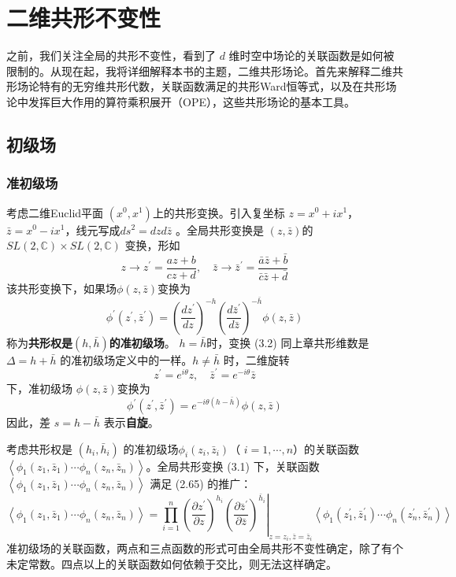 \chapter{二维共形不变性}

之前，我们关注全局的共形不变性，看到了 $d$ 维时空中场论的关联函数是如何被限制的。从现在起，我将详细解释本书的主题，二维共形场论。首先来解释二维共形场论特有的无穷维共形代数，关联函数满足的共形Ward恒等式，以及在共形场论中发挥巨大作用的算符乘积展开（OPE），这些共形场论的基本工具。

\section{初级场}
\subsection{准初级场}
考虑二维Euclid平面 $(x^0,x^1) $上的共形变换。引入复坐标 $z=x^0+ix^1 $，$ \bar{z}=x^0-ix^1 $，线元写成$ ds^2=dzd\bar{z}$ 。全局共形变换是 $(z,\bar{z}) $的$ S L(2, \mathbb{C}) \times S L(2, \mathbb{C})$ 变换，形如
\begin{equation}
z \rightarrow z^{\prime}=\frac{a z+b}{c z+d}, \quad \bar{z} \rightarrow \bar{z}^{\prime}=\frac{\bar{a} \bar{z}+\bar{b}}{\bar{c} \bar{z}+\bar{d}}
\end{equation}
该共形变换下，如果场$ \phi(z,\bar{z}) $变换为
\begin{equation}
		\phi^{\prime}\left(z^{\prime}, \bar{z}^{\prime}\right)=\left(\frac{d z^{\prime}}{d z}\right)^{-h}\left(\frac{d \bar{z}^{\prime}}{d \bar{z}}\right)^{-\bar{h}} \phi(z, \bar{z})
\end{equation}
称为\textbf{共形权是$ (h,\bar{h}) $的准初级场}。 $h=\bar{h} $时，变换 (3.2) 同上章共形维数是$ \Delta=h+\bar{h}$ 的准初级场定义中的一样。$ h\neq \bar{h}$ 时，二维旋转
\[
z^{\prime}=e^{i \theta} z, \quad \bar{z}^{\prime}=e^{-i \theta} \bar{z}
\]
下，准初级场 $\phi(z,\bar{z}) $变换为
\[
\phi^{\prime}\left(z^{\prime}, \bar{z}^{\prime}\right)=e^{-i \theta(h-\bar{h})} \phi(z, \bar{z})
\]
因此，差 $s=h-\bar{h}$ 表示\textbf{自旋}。

考虑共形权是 $(h_i,\bar{h}_i)$ 的准初级场$ \phi_i(z_i,\bar{z}_i) $（ $i=1,\cdots,n $）的关联函数 $\left\langle\phi_{1}\left(z_{1}, \bar{z}_{1}\right) \cdots \phi_{n}\left(z_{n}, \bar{z}_{n}\right)\right\rangle $。全局共形变换 (3.1) 下，关联函数 $\left\langle\phi_{1}\left(z_{1}, \bar{z}_{1}\right) \cdots \phi_{n}\left(z_{n}, \bar{z}_{n}\right)\right\rangle$ 满足 (2.65) 的推广：
\begin{equation}
\left\langle\phi_{1}\left(z_{1}, \bar{z}_{1}\right) \cdots \phi_{n}\left(z_{n}, \bar{z}_{n}\right)\right\rangle=\left.\prod_{i=1}^{n}\left(\frac{\partial z^{\prime}}{\partial z}\right)^{h_{i}}\left(\frac{\partial \bar{z}^{\prime}}{\partial \bar{z}}\right)^{\bar{h}_{i}}\right|_{z=z_{i}, \bar{z}=\bar{z}_{i}}\left\langle\phi_{1}\left(z_{1}^{\prime}, \bar{z}_{1}^{\prime}\right) \cdots \phi_{n}\left(z_{n}^{\prime}, \bar{z}_{n}^{\prime}\right)\right\rangle
\end{equation}
准初级场的关联函数，两点和三点函数的形式可由全局共形不变性确定，除了有个未定常数。四点以上的关联函数如何依赖于交比，则无法这样确定。

